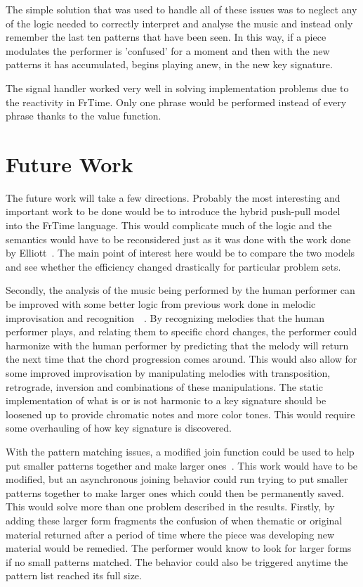 \documentclass[12pt]{ucthesis}
\begin{document}
{The simple solution that was used to handle all of these issues was to neglect any of the logic needed to correctly interpret and analyse the music and instead only remember the last ten patterns that have been seen. In this way, if a piece modulates the performer is 'confused' for a moment and then with the new patterns it has accumulated, begins playing anew, in the new key signature. 

The signal handler worked very well in solving implementation problems due to the reactivity in FrTime. Only one phrase would be performed instead of every phrase thanks to the value function.

\chapter{Future Work}
\label{future}

The future work will take a few directions. Probably the most interesting and important work to be done would be to introduce the hybrid push-pull model into the FrTime language. This would complicate much of the logic and the semantics would have to be reconsidered just as it was done with the work done by Elliott~\cite{push-pull-frp}. The main point of interest here would be to compare the two models and see whether the efficiency changed drastically for particular problem sets. 

Secondly, the analysis of the music being performed by the human performer can be improved with some better logic from previous work done in melodic improvisation and recognition~\cite{MelodicImprovisation}~\cite{MelodicRecognition}. By recognizing melodies that the human performer plays, and relating them to specific chord changes, the performer could harmonize with the human performer by predicting that the melody will return the next time that the chord progression comes around. This would also allow for some improved improvisation by manipulating melodies with transposition, retrograde, inversion and combinations of these manipulations. The static implementation of what is or is not harmonic to a key signature should be loosened up to provide chromatic notes and more color tones. This would require some overhauling of how key signature is discovered. 

With the pattern matching issues, a modified join function could be used to help put smaller patterns together and make larger ones~\cite{slidingWindow}. This work would have to be modified, but an asynchronous joining behavior could run trying to put smaller patterns together to make larger ones which could then be permanently saved. This would solve more than one problem described in the results. Firstly, by adding these larger form fragments the confusion of when thematic or original material returned after a period of time where the piece was developing new material would be remedied. The performer would know to look for larger forms if no small patterns matched. The behavior could also be triggered anytime the pattern list reached its full size. 

}
\end{document}
